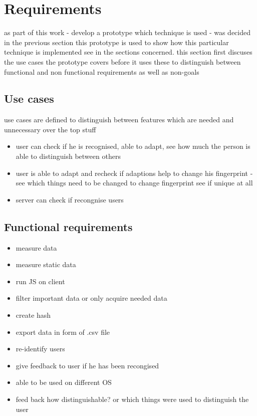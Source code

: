 \chapter{Requirements}
\label{cha:requirements}
as part of this work - develop a prototype
which technique is used - was decided in the previous section
this prototype is used to show how this particular technique is implemented
see in the sections concerned.
this section first discuses the use cases the prototype covers before it uses these to distinguish between functional and non functional requirements
as well as non-goals


\section{Use cases}
use cases are defined to distinguish between features which are needed and unnecessary over the top stuff

\begin{itemize}
	\item user can check if he is recognised, able to adapt, see how much the person is able to distinguish between others
	\item user is able to adapt and recheck if adaptions help to change his fingerprint - see which things need to be changed to change fingerprint
	see if unique at all
	\item server can check if recongnise users 
\end{itemize}

\section{Functional requirements}

\begin{itemize}
\item{measure data}
\item measure static data
\item run JS on client
\item filter important data or only acquire needed data
\item{create hash}
\item export data in form of .csv file
\item{re-identify users}
\item give feedback to user if he has been recongised
\item able to be used on different OS
\item feed back how distinguishable? or which things were used to distinguish the user
\end{itemize}

